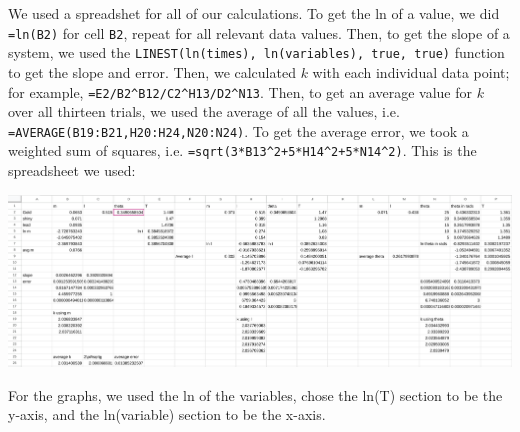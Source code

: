 \documentclass[12pt]{article}
\begin{document}
We used a spreadshet for all of our calculations. To get the ln of a value, we did \texttt{=ln(B2)} for cell \texttt{B2}, repeat for all relevant data values. Then, to get the slope of a system, we used the \texttt{LINEST(ln(times), ln(variables), true, true)} function to get the slope and error. Then, we calculated \(k\) with each individual data point; for example, \texttt{=E2/B2\textasciicircum{}B12/C2\textasciicircum{}H13/D2\textasciicircum{}N13}. Then, to get an average value for \(k\) over all thirteen trials, we used the average of all the values, i.e. \texttt{=AVERAGE(B19:B21,H20:H24,N20:N24)}. To get the average error, we took a weighted sum of squares, i.e. \texttt{=sqrt(3*B13\textasciicircum{}2+5*H14\textasciicircum{}2+5*N14\textasciicircum{}2)}. This is the spreadsheet we used:

\begin{center}
\includegraphics[width=6.5in]{./spreadsheet.png}
\end{center}

For the graphs, we used the ln of the variables, chose the ln(T) section to be the y-axis, and the ln(variable) section to be the x-axis.
\end{document}

